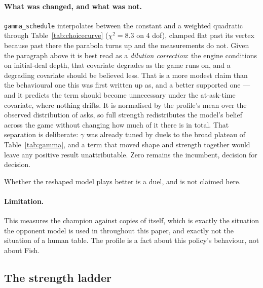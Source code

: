 \documentclass[11pt,a4paper]{article}
\begin{document}
\paragraph{What was changed, and what was not.} \texttt{gamma\_schedule}
interpolates between the constant and a weighted quadratic through
Table~\ref{tab:choicecurve} ($\chi^2 = 8.3$ on 4 dof), clamped flat past its
vertex because past there the parabola turns up and the measurements do not.
Given the paragraph above it is best read as a \emph{dilution correction}: the
engine conditions on initial-deal depth, that covariate degrades as the game
runs on, and a degrading covariate should be believed less. That is a more modest
claim than the behavioural one this was first written up as, and a better
supported one --- and it predicts the term should become unnecessary under the
at-ask-time covariate, where nothing drifts. It
is normalised by the profile's mean over the observed distribution of asks, so
full strength redistributes the model's belief across the game without changing
how much of it there is in total. That separation is deliberate: $\gamma$ was
already tuned by duels to the broad plateau of Table~\ref{tab:gamma}, and a term
that moved shape and strength together would leave any positive result
unattributable. Zero remains the incumbent, decision for decision.

Whether the reshaped model plays better is a duel, and is not claimed here.

\paragraph{Limitation.} This measures the champion against copies of itself,
which is exactly the situation the opponent model is used in throughout this
paper, and exactly not the situation of a human table. The profile is a fact
about this policy's behaviour, not about Fish.

\subsection{The strength ladder}
\label{sec:res-ladder}
\end{document}
